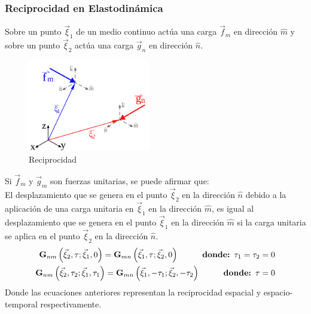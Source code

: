 \begin{frame}[allowframebreaks]
\frametitle{Reciprocidad en Elastodinámica}
%
\justifying
%
Sobre un punto $\vec{\xi}_1$ de un medio continuo actúa una carga $\vec{f}_m$ en dirección $\hat{m}$ y sobre un punto $\vec{\xi}_2$ actúa una carga $\vec{g}_n$ en dirección $\hat{n}$.
%
%
\begin{figure}[h]
	\centering
	\includegraphics[height=4cm]{img/Reciprocity.pdf}
	\caption{Reciprocidad}
	\vspace{-.5 cm}
\end{figure}
%
Si $\vec{f}_m$ y $\vec{g}_m$ son fuerzas unitarias, se puede afirmar que:\\
%
El desplazamiento que se genera en el punto $\vec{\xi}_2$ en la dirección $\hat{n}$ debido a la aplicación de una carga unitaria en $\vec{\xi}_1$ en la dirección $\hat{m}$, es igual al desplazamiento que se genera en el punto $\vec{\xi}_1$ en la dirección $\hat{m}$ si la carga unitaria se aplica en el punto $\vec{\xi}_2$ en la dirección $\hat{n}$.
%
\begin{align*}
	\mathbf{G}_{nm} \left( \vec{\xi}_2, \tau ; \vec{\xi}_1, 0 \right)  = \mathbf{G}_{mn} \left( \vec{\xi}_1, \tau ; \vec{\xi}_2, 0 \right) \hspace{1 cm} \textbf{donde: $\tau_1=\tau_2=0$}\\
	\mathbf{G}_{nm} \left( \vec{\xi}_2, \tau_2 ; \vec{\xi}_1, \tau_1 \right)  = \mathbf{G}_{mn} \left( \vec{\xi}_1, -\tau_1 ; \vec{\xi}_2, -\tau_2 \right) \hspace{1 cm} \textbf{donde: $\tau=0$}
\end{align*}
%
Donde las ecuaciones anteriores representan la reciprocidad espacial y espacio-temporal respectivamente.
%
%
\end{frame}
%
%
